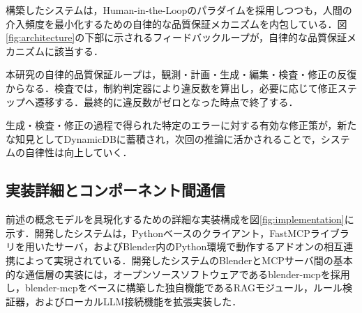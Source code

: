 \documentclass[dvipdfmx, a4paper, 9pt]{deimj}
\begin{document}
構築したシステムは，Human-in-the-Loopのパラダイムを採用しつつも，人間の介入頻度を最小化するための自律的な品質保証メカニズムを内包している．図\ref{fig:architecture}の下部に示されるフィードバックループが，自律的な品質保証メカニズムに該当する．

本研究の自律的品質保証ループは，観測・計画・生成・編集・検査・修正の反復からなる．検査では，制約判定器により違反数を算出し，必要に応じて修正ステップへ遷移する．最終的に違反数がゼロとなった時点で終了する．

生成・検査・修正の過程で得られた特定のエラーに対する有効な修正策が，新たな知見としてDynamicDBに蓄積され，次回の推論に活かされることで，システムの自律性は向上していく．

\subsection{実装詳細とコンポーネント間通信}

前述の概念モデルを具現化するための詳細な実装構成を図\ref{fig:implementation}に示す．開発したシステムは，Pythonベースのクライアント，FastMCPライブラリを用いたサーバ，およびBlender内のPython環境で動作するアドオンの相互連携によって実現されている．開発したシステムのBlenderとMCPサーバ間の基本的な通信層の実装には，オープンソースソフトウェアであるblender-mcp\cite{ahuja2025blendermcp}を採用し，blender-mcpをベースに構築した独自機能であるRAGモジュール，ルール検証器，およびローカルLLM接続機能を拡張実装した．
\end{document}
